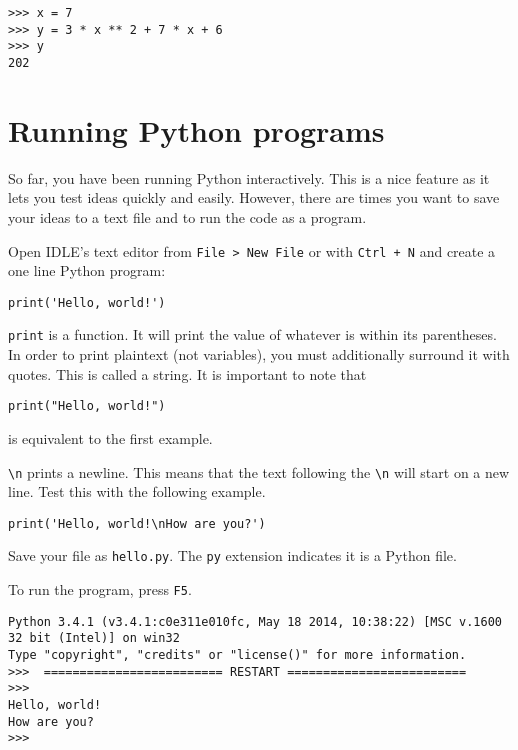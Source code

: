 \documentclass[12pt]{article}
\begin{document}
\begin{lstlisting}[style=bash]
>>> x = 7
>>> y = 3 * x ** 2 + 7 * x + 6
>>> y
202
\end{lstlisting}


\section{Running Python programs} 

So far, you have been running Python interactively. This is a nice feature as it lets you test ideas quickly and easily. However, there are times you want to save your ideas to a text file and to run the code as a program.

Open IDLE's text editor from \texttt{File > New File} or with \texttt{Ctrl + N} and create a one line Python program:

\begin{lstlisting}[style=c]
print('Hello, world!')
\end{lstlisting}

\texttt{print} is a function. It will print the value of whatever is within its parentheses. In order to print plaintext (not variables), you must additionally surround it with quotes. This is called a string. It is important to note that

\begin{lstlisting}[style=c]
print("Hello, world!")
\end{lstlisting}

is equivalent to the first example.

\texttt{\textbackslash n} prints a newline. This means that the text following the \texttt{\textbackslash n} will start on a new line. Test this with the following example.

\begin{lstlisting}[style=c]
print('Hello, world!\nHow are you?')
\end{lstlisting}

Save your file as \texttt{hello.py}. The \texttt{py} extension indicates it is a Python file.

To run the program, press \texttt{F5}.

\begin{lstlisting}[style=bash]
Python 3.4.1 (v3.4.1:c0e311e010fc, May 18 2014, 10:38:22) [MSC v.1600 32 bit (Intel)] on win32
Type "copyright", "credits" or "license()" for more information.
>>>  ========================= RESTART =========================
>>> 
Hello, world!
How are you?
>>> 
\end{lstlisting}
\end{document}
